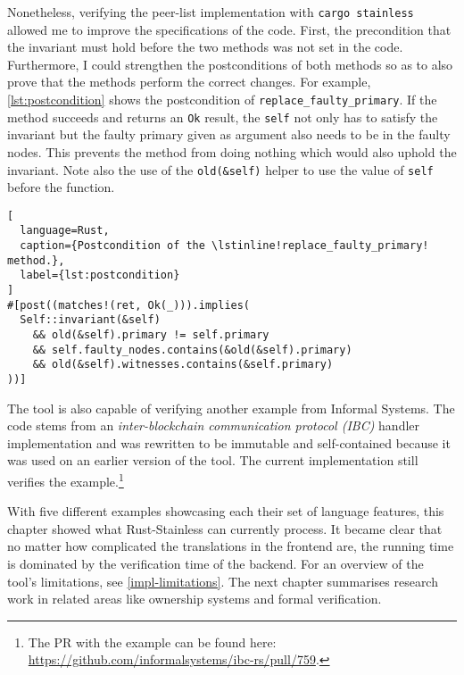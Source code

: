 Nonetheless, verifying the peer-list implementation with
\passthrough{\lstinline!cargo stainless!} allowed me  to improve the
specifications of the code. First, the precondition that the invariant must hold
before the two methods was not set in the code. Furthermore, I could strengthen
the postconditions of  both methods so as to also prove that the methods perform
the correct changes. For example, \autoref{lst:postcondition} shows the
postcondition of \lstinline!replace_faulty_primary!. If the method succeeds and
returns an \lstinline!Ok! result, the \lstinline!self! not only has to satisfy
the invariant but the faulty primary given as argument also needs to be in the
faulty nodes. This prevents the method from doing nothing which would also
uphold the invariant. Note also the use of the \lstinline!old(&self)! helper to
use the value of \lstinline!self! before the function.

\begin{lstlisting}[
  language=Rust,
  caption={Postcondition of the \lstinline!replace_faulty_primary! method.},
  label={lst:postcondition}
]
#[post((matches!(ret, Ok(_))).implies(
  Self::invariant(&self)
    && old(&self).primary != self.primary
    && self.faulty_nodes.contains(&old(&self).primary)
    && old(&self).witnesses.contains(&self.primary)
))]
\end{lstlisting}

The tool is also capable of verifying another example from Informal Systems. The
code stems from an \emph{inter-blockchain communication protocol (IBC)} handler
implementation and was rewritten to be immutable and self-contained because it
was used on an earlier version of the tool. The current implementation still
verifies the example.\footnote{The PR with the example can be found here:
\url{https://github.com/informalsystems/ibc-rs/pull/759}.}

\hfill \break \noindent With five different examples showcasing each their set
of language features, this chapter showed what Rust-Stainless can currently
process. It became clear that no matter how complicated the translations in the
frontend are, the running time is dominated by the verification time of the
backend. For an overview of the tool's limitations, see
\autoref{impl-limitations}. The next chapter summarises research  work in
related areas like ownership systems and formal verification.

